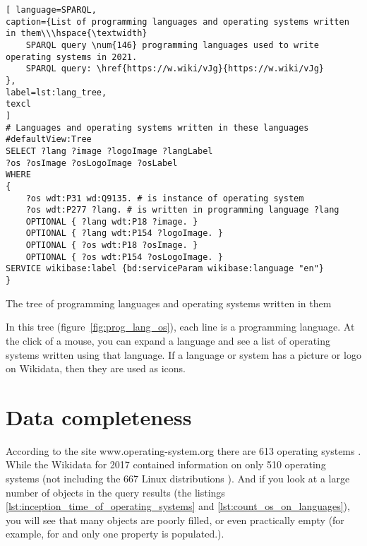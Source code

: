 \begin{lstlisting}[ language=SPARQL, 
caption={List of programming languages and operating systems written in them\\\hspace{\textwidth}
	SPARQL query \num{146} programming languages used to write operating systems in 2021.
	SPARQL query: \href{https://w.wiki/vJg}{https://w.wiki/vJg}
},
label=lst:lang_tree,
texcl 
]
# Languages and operating systems written in these languages
#defaultView:Tree
SELECT ?lang ?image ?logoImage ?langLabel 
?os ?osImage ?osLogoImage ?osLabel 
WHERE 
{
	?os wdt:P31 wd:Q9135. # is instance of operating system
	?os wdt:P277 ?lang. # is written in programming language ?lang
	OPTIONAL { ?lang wdt:P18 ?image. }
	OPTIONAL { ?lang wdt:P154 ?logoImage. }
	OPTIONAL { ?os wdt:P18 ?osImage. }
	OPTIONAL { ?os wdt:P154 ?osLogoImage. }
SERVICE wikibase:label {bd:serviceParam wikibase:language "en"}
}
\end{lstlisting}

\begin{marginfigure}[-4.0cm]
	{
		\setlength{\fboxsep}{0pt}%
		\setlength{\fboxrule}{1pt}%
	}
	\caption{The tree of programming languages and operating systems written in them}
	\label{fig:prog_lang_os}
\end{marginfigure}

In this tree (figure~\ref{fig:prog_lang_os}), each line is a programming language. At the click of a mouse, you can expand a language and see a list of operating systems written using that language. If a language or system has a picture or logo on Wikidata, then they are used as icons.

\section{Data completeness}
According to the site www.operating-system.org there are 613 operating systems \cite{list_operating_systems}. While the Wikidata for 2017 contained information on only 510 operating systems (not including the \num{667} Linux distributions \cite{list_operating_systems}). And if you look at a large number of objects in the query results (the listings \ref{lst:inception_time_of_operating_systems} and \ref{lst:count_os_on_languages}), you will see that many objects are poorly filled, or even practically empty (for example, for  and  only one property \cite{prowd_os_link} is populated.).

